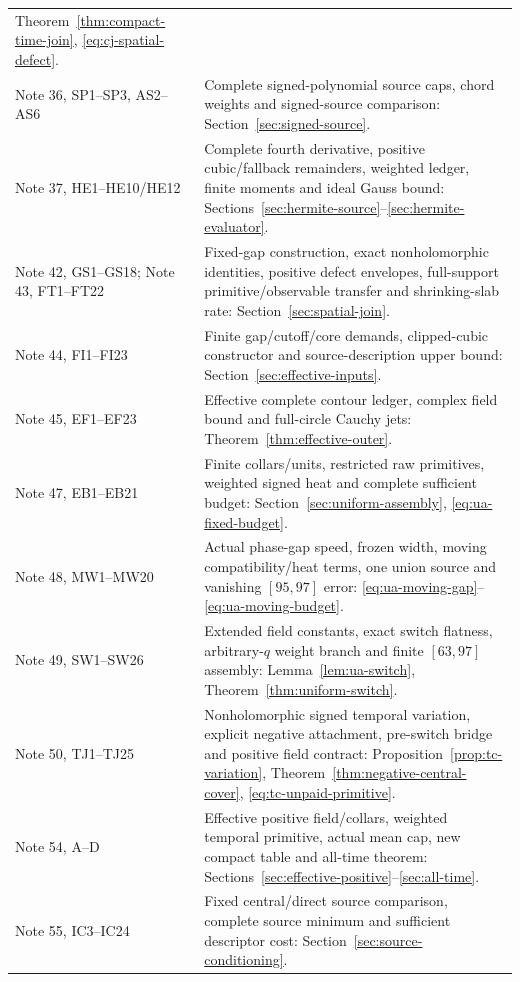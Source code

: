 \begin{longtable}{@{}>{\raggedright\arraybackslash}p{}>{\raggedright\arraybackslash}p{}@{}}
Theorem~\ref{thm:compact-time-join}, \eqref{eq:cj-spatial-defect}.\\
Note 36, SP1--SP3, AS2--AS6 & Complete signed-polynomial source caps,
chord weights and signed-source comparison: Section~\ref{sec:signed-source}.\\
Note 37, HE1--HE10/HE12 & Complete fourth derivative, positive cubic/fallback
remainders, weighted ledger, finite moments and ideal Gauss bound:
Sections~\ref{sec:hermite-source}--\ref{sec:hermite-evaluator}.\\
Note 42, GS1--GS18; Note 43, FT1--FT22 & Fixed-gap construction,
exact nonholomorphic identities, positive defect envelopes, full-support
primitive/observable transfer and shrinking-slab rate:
Section~\ref{sec:spatial-join}.\\
Note 44, FI1--FI23 & Finite gap/cutoff/core demands, clipped-cubic
constructor and source-description upper bound:
Section~\ref{sec:effective-inputs}.\\
Note 45, EF1--EF23 & Effective complete contour ledger, complex field
bound and full-circle Cauchy jets: Theorem~\ref{thm:effective-outer}.\\
Note 47, EB1--EB21 & Finite collars/units, restricted raw primitives,
weighted signed heat and complete sufficient budget:
Section~\ref{sec:uniform-assembly}, \eqref{eq:ua-fixed-budget}.\\
Note 48, MW1--MW20 & Actual phase-gap speed, frozen width, moving
compatibility/heat terms, one union source and vanishing $[95,97]$ error:
\eqref{eq:ua-moving-gap}--\eqref{eq:ua-moving-budget}.\\
Note 49, SW1--SW26 & Extended field constants, exact switch flatness,
arbitrary-$q$ weight branch and finite $[63,97]$ assembly:
Lemma~\ref{lem:ua-switch}, Theorem~\ref{thm:uniform-switch}.\\
Note 50, TJ1--TJ25 & Nonholomorphic signed temporal variation, explicit
negative attachment, pre-switch bridge and positive field contract:
Proposition~\ref{prop:tc-variation},
Theorem~\ref{thm:negative-central-cover}, \eqref{eq:tc-unpaid-primitive}.\\
Note 54, A--D & Effective positive field/collars, weighted temporal
primitive, actual mean cap, new compact table and all-time theorem:
Sections~\ref{sec:effective-positive}--\ref{sec:all-time}.\\
Note 55, IC3--IC24 & Fixed central/direct source comparison, complete
source minimum and sufficient descriptor cost:
Section~\ref{sec:source-conditioning}.\\

\end{longtable}
